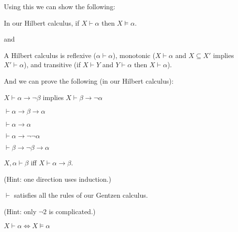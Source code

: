 \elemm

Using this we can show the following:

\blemm

    In our Hilbert calculus, if $X\vdash\alpha$ then $X\vDash\alpha$.

\elemm

and

\blemm

    A Hilbert calculus is reflexive ($\alpha\vdash\alpha$), monotonic ($X\vdash\alpha$ and
    $X\subseteq X'$ implies $X'\vdash\alpha$), and transitive (if $X\vdash Y$ and $Y\vdash\alpha$
    then $X\vdash\alpha$).

\elemm

And we can prove the following (in our Hilbert calculus):

\blemm

    \benum
        \item $X\vdash\alpha\to\neg\beta$ implies $X\vdash\beta\to\neg\alpha$
        \item $\vdash\alpha\to\beta\to\alpha$
        \item $\vdash\alpha\to\alpha$
        \item $\vdash\alpha\to\neg\neg\alpha$
        \item $\vdash\beta\to\neg\beta\to\alpha$
    \eenum

\elemm

\blemm[title=The Deduction Theorem]

    $X,\alpha\vdash\beta$ iff $X\vdash\alpha\to\beta$.

\elemm

(Hint: one direction uses induction.)

\blemm

    $\vdash$ satisfies all the rules of our Gentzen calculus.

\elemm

(Hint: only $\neg2$ is complicated.)

\bthrm[title=The Completeness Theorem]

    $X\vdash\alpha\iff X\vDash\alpha$

\ethrm

